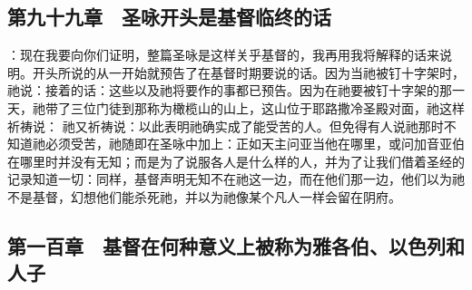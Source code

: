 
\subsection{第九十九章　圣咏开头是基督临终的话}

：现在我要向你们证明，整篇圣咏是这样关乎基督的，我再用我将解释的话来说明。开头所说的从一开始就预告了在基督时期要说的话。因为当祂被钉十字架时，祂说：接着的话：这些以及祂将要作的事都已预告。因为在祂要被钉十字架的那一天，祂带了三位门徒到那称为橄榄山的山上，这山位于耶路撒冷圣殿对面，祂这样祈祷说： 祂又祈祷说：以此表明祂确实成了能受苦的人。但免得有人说祂那时不知道祂必须受苦，祂随即在圣咏中加上：正如天主问亚当他在哪里，或问加音亚伯在哪里时并没有无知；而是为了说服各人是什么样的人，并为了让我们借着圣经的记录知道一切：同样，基督声明无知不在祂这一边，而在他们那一边，他们以为祂不是基督，幻想他们能杀死祂，并以为祂像某个凡人一样会留在阴府。\par


\subsection{第一百章　基督在何种意义上被称为雅各伯、以色列和人子}


